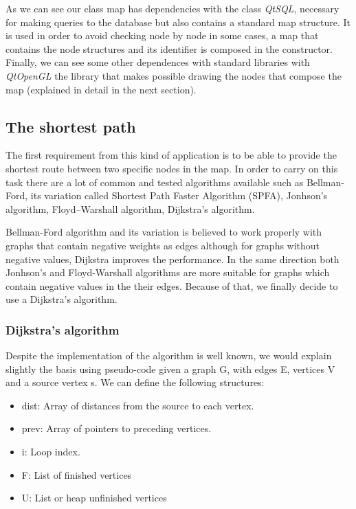 \documentclass{article}
\begin{document}
As we can see our class map has dependencies with the class \textit{QtSQL}, necessary for making queries to the database but also contains a standard map structure. It is used in order to avoid checking node by node in some cases, a map that contains the node structures and its identifier is composed in the constructor. Finally, we can see some other dependences with standard libraries with \textit{QtOpenGL} the library that makes possible drawing the nodes that compose the map (explained in detail in the next section).

\subsection{The shortest path}
The first requirement from this kind of application is to be able to provide the shortest route between two specific nodes in the map. In order to carry on this task there are a lot of common and tested algorithms available such as Bellman-Ford, its variation called  Shortest Path Faster Algorithm (SPFA), Jonhson's algorithm, Floyd–Warshall algorithm, Dijkstra's algorithm.

Bellman-Ford algorithm and its variation is believed to work properly with graphs that contain negative weights as edges although for graphs without negative values, Dijkstra improves the performance. In the same direction both Jonhson's and Floyd-Warshall algorithms are more suitable for graphs which contain negative values in the their edges. Because of that, we finally decide to use a Dijkstra's algorithm.

\subsubsection{Dijkstra's algorithm}
Despite the implementation of the algorithm is well known, we would explain slightly the basis using pseudo-code given a graph G, with edges E, vertices V and a source vertex s. We can define the following structures:

\begin{itemize}
  \item dist: Array of distances from the source to each vertex.
  \item prev: Array of pointers to preceding vertices.
  \item i: Loop index.
  \item F: List of finished vertices
  \item U: List or heap unfinished vertices
\end{itemize}
\end{document}
